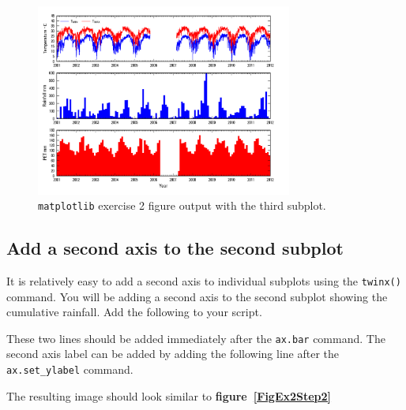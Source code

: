 \documentclass[12pt]{article}
\begin{document}
\begin{figure}[hp]
	\centering
  	\includegraphics[width=0.75\textwidth]{figures/MeterologicBar_step1.png}
 	\caption{\texttt{matplotlib} exercise 2 figure output with the third subplot.}
	\label{FigEx2Step1}
\end{figure}

\subsection{Add a second axis to the second subplot}
It is relatively easy to add a second axis to individual subplots using the \texttt{twinx()} command. You will be adding a second axis to the second subplot showing the cumulative rainfall. Add the following to your script.

\begin{center}
	
\end{center}

These two lines should be added immediately after the \texttt{ax.bar} command. The second axis label can be added by adding the following line after the \texttt{ax.set\_ylabel} command.

\begin{center}
	
\end{center}

The resulting image should look similar to \textbf{figure~\ref{FigEx2Step2}}
\end{document}
